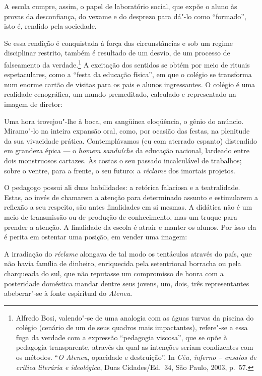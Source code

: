A escola cumpre, assim, o papel de laboratório social, que expõe o aluno
às provas da desconfiança, do vexame e do desprezo para dá"-lo como
``formado'', isto é, rendido pela sociedade.

Se essa rendição é conquistada à força das
circunstâncias e sob um regime disciplinar restrito, também é resultado
de um desvio, de um processo de falseamento da verdade.\footnote{Alfredo Bosi, 
valendo"-se de uma analogia com as águas turvas da
piscina do colégio (cenário de um de seus quadros mais impactantes),
refere"-se a essa fuga da verdade com a expressão ``pedagogia viscosa'',
que se opõe à pedagogia transparente, através da qual as intenções
seriam condizentes com os métodos. ``\textit{O Ateneu}, opacidade e
destruição''. In \textit{Céu, inferno -- ensaios de crítica literária e
ideológica}, Duas Cidades/Ed.~34, São Paulo, 2003, p.~57.} 
A excitação dos sentidos se obtém por meio de
rituais espetaculares, como a ``festa da educação física'', em que o
colégio se transforma num enorme cartão de visitas para os pais e
alunos ingressantes. O colégio é uma realidade cenográfica, um mundo
premeditado, calculado e representado na imagem de diretor:

\begin{hedraquote}
Uma hora trovejou"-lhe à boca, em sangüínea eloqüência,
o gênio do anúncio. Miramo"-lo na inteira expansão oral, como, por
ocasião das festas, na plenitude da sua vivacidade prática.
Contemplávamos (eu com aterrado espanto) distendido em grandeza épica ---
o \textit{homem sanduíche} da educação
nacional, lardeado entre dois monstruosos cartazes. Às costas o seu
passado incalculável de trabalhos; sobre o ventre, para a frente, o seu
futuro: a \textit{réclame} dos imortais projetos.
\end{hedraquote}

O pedagogo possui ali duas habilidades: a retórica falaciosa e a
teatralidade. Estas, ao invés de chamarem a atenção para determinado
assunto e estimularem a reflexão a seu respeito, são antes finalidades
em si mesmas. A didática não é um meio de transmissão ou de produção de
conhecimento, mas um truque para prender a atenção. A finalidade da
escola é atrair e manter os alunos. Por isso ela é perita em ostentar
uma posição, em vender uma imagem:

\begin{hedraquote}
A irradiação do
\textit{réclame} alongava de tal modo os
tentáculos através do país, que não havia família de dinheiro,
enriquecida pela setentrional borracha ou pela charqueada do sul, que
não reputasse um compromisso de honra com a posteridade doméstica
mandar dentre seus jovens, um, dois, três representantes abeberar"-se à
fonte espiritual do \textit{Ateneu}.
\end{hedraquote}

